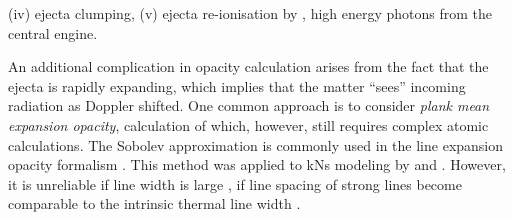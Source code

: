 (iv) ejecta clumping, 
(v) ejecta re-ionisation by \eg, high energy photons from the central engine.


An additional complication in opacity calculation arises from the fact that the ejecta 
is rapidly expanding, which implies that the matter ``sees'' incoming radiation as 
Doppler shifted. 
One common approach is to consider \textit{plank mean expansion opacity}, 
calculation of which, however, still requires complex atomic calculations.
%
The Sobolev approximation is commonly used in the line expansion opacity formalism 
\citep{Pinto:2000}.
This method was applied to \acp{kN} modeling by \citet{Barnes:2013wka} and \citet{Tanaka:2013ana}. 
However, it is unreliable if line width is large \ie, if line spacing of strong 
lines become comparable to the intrinsic thermal line width 
\citep{Kasen:2013xka,Fontes:2015,Fontes:2017zfb}. 


